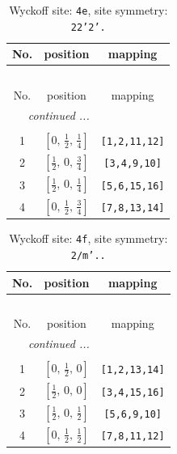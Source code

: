 \documentclass[fleqn,8pt]{jsarticle}
\begin{document}
\begin{longtable}{ccc}
\caption{Wyckoff site: {\tt 4e}, site symmetry: {\tt 22'2'.}}
 \\
 \hline \hline
No. & position & mapping \\ \hline \endfirsthead

\multicolumn{2}{l}{\tablename\ \thetable{}} \\
 \hline \hline
No. & position & mapping \\ \hline \endhead

 \hline \hline
\multicolumn{2}{r}{\footnotesize\it continued ...} \\ \endfoot

 \hline \hline
\multicolumn{2}{r}{} \\ \endlastfoot

1 & $\left[ 0,\, \frac{1}{2},\, \frac{1}{4} \right]$ & {\tt [1,2,11,12]} \\ \hline
2 & $\left[ \frac{1}{2},\, 0,\, \frac{3}{4} \right]$ & {\tt [3,4,9,10]} \\ \hline
3 & $\left[ \frac{1}{2},\, 0,\, \frac{1}{4} \right]$ & {\tt [5,6,15,16]} \\ \hline
4 & $\left[ 0,\, \frac{1}{2},\, \frac{3}{4} \right]$ & {\tt [7,8,13,14]} \\
\end{longtable}
\renewcommand{\arraystretch}{1.2}
\begin{longtable}{ccc}
\caption{Wyckoff site: {\tt 4f}, site symmetry: {\tt 2/m'..}}
 \\
 \hline \hline
No. & position & mapping \\ \hline \endfirsthead

\multicolumn{2}{l}{\tablename\ \thetable{}} \\
 \hline \hline
No. & position & mapping \\ \hline \endhead

 \hline \hline
\multicolumn{2}{r}{\footnotesize\it continued ...} \\ \endfoot

 \hline \hline
\multicolumn{2}{r}{} \\ \endlastfoot

1 & $\left[ 0,\, \frac{1}{2},\, 0 \right]$ & {\tt [1,2,13,14]} \\ \hline
2 & $\left[ \frac{1}{2},\, 0,\, 0 \right]$ & {\tt [3,4,15,16]} \\ \hline
3 & $\left[ \frac{1}{2},\, 0,\, \frac{1}{2} \right]$ & {\tt [5,6,9,10]} \\ \hline
4 & $\left[ 0,\, \frac{1}{2},\, \frac{1}{2} \right]$ & {\tt [7,8,11,12]} \\
\end{longtable}
\end{document}
